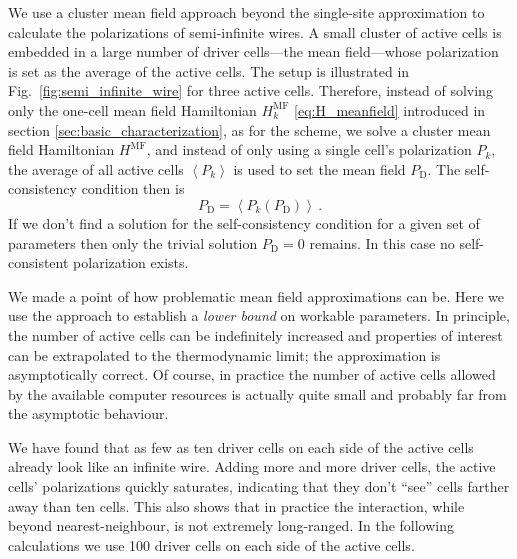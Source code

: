 We use a cluster mean field approach beyond the single-site  approximation
to calculate the polarizations of semi-infinite wires. A small cluster of active
cells is embedded in a large number of driver cells---the mean field---whose
polarization is set as the average of the active cells. The setup is illustrated
in Fig.~\ref{fig:semi_infinite_wire} for three active cells. Therefore, instead
of solving only the one-cell mean field Hamiltonian $H^{\mathrm{MF}}_k$
\eqref{eq:H_meanfield} introduced in section \ref{sec:basic_characterization},
as for the  scheme, we solve a cluster mean field Hamiltonian
$H^{\mathrm{MF}}$, and instead of only using a single cell's polarization $P_k$,
the average of all active cells $\left< P_k \right>$ is used to set the mean
field $P_\text{D}$. The self-consistency condition then is
%
\begin{equation}
  P_\text{D} = \left< P_k \left( P_\text{D} \right) \right> \, .
\end{equation}
%
If we don't find a solution for the self-consistency condition for a given set
of parameters then only the trivial solution $P_\text{D} = 0$ remains. In this case no
self-consistent polarization exists.

We made a point of how problematic mean field approximations can be. Here we use
the approach to establish a \emph{lower bound} on workable parameters. In
principle, the number of active cells can be indefinitely increased and
properties of interest can be extrapolated to the thermodynamic limit; the
approximation is asymptotically correct. Of course, in practice the number of
active cells allowed by the available computer resources is actually quite small
and probably far from the asymptotic behaviour.

We have found that as few as ten driver cells on each side of the active cells
already look like an infinite wire. Adding more and more driver cells, the active
cells' polarizations quickly saturates, indicating that they don't ``see'' cells
farther away than ten cells. This also shows that in practice the interaction,
while beyond nearest-neighbour, is not extremely long-ranged. In the following
calculations we use 100 driver cells on each side of the active cells.

